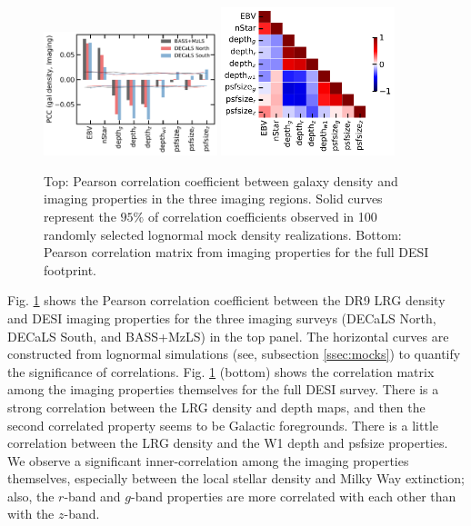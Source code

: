 \begin{figure}
    \includegraphics[width=0.45\textwidth]{figures/pcc.pdf} 
    \includegraphics[width=0.45\textwidth]{figures/pccx.pdf}     
    \caption{Top: Pearson correlation coefficient between galaxy density and imaging properties in the three imaging regions. Solid curves represent the $95\%$ of correlation coefficients observed in 100 randomly selected lognormal mock density realizations. Bottom: Pearson correlation matrix from imaging properties for the full DESI footprint.}
    \label{fig:pcc}
\end{figure}



Fig. \ref{fig:pcc} shows the Pearson correlation coefficient between the DR9 LRG density and DESI imaging properties for the three imaging surveys (DECaLS North, DECaLS South, and BASS+MzLS) in the top panel. The horizontal curves are constructed from lognormal simulations (see, subsection \ref{ssec:mocks}) to quantify the significance of correlations. Fig. \ref{fig:pcc} (bottom) shows the correlation matrix among the imaging properties themselves for the full DESI survey. There is a strong correlation between the LRG density and depth maps, and then the second correlated property seems to be Galactic foregrounds. There is a little correlation between the LRG density and the W1 depth and psfsize properties. We observe a significant inner-correlation among the imaging properties themselves, especially between the local stellar density and Milky Way extinction; also, the $r$-band and $g$-band properties are more correlated with each other than with the $z$-band. 

